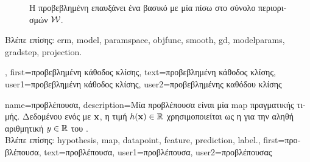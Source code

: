 {{\begin{figure}[H]
\begin{center}
		\end{center}
		{
		\caption{\foreignlanguage{greek}{Η προβεβλημένη}  \foreignlanguage{greek}{επαυξάνει ένα βασικό} 
			 \foreignlanguage{greek}{με μία}  \foreignlanguage{greek}{πίσω στο σύνολο 
			περιορισμών} $\mathcal{W}$.}
		\label{fig_projected_GD_dict} }
		\end{figure}
		\foreignlanguage{greek}{Βλέπε επίσης:} \gls{erm}, \gls{model}, \gls{paramspace}, \gls{objfunc}, \gls{smooth}, \gls{gd}, \glspl{modelparam}, 
		\gls{gradstep}, \gls{projection}.},
	first={\foreignlanguage{greek}{προβεβλημένη κάθοδος κλίσης}},
	text={\foreignlanguage{greek}{προβεβλημένη κάθοδος κλίσης}},
	user1={\foreignlanguage{greek}{προβεβλημένη κάθοδος κλίσης}}, %
	user2={\foreignlanguage{greek}{προβεβλημένης καθόδου κλίσης}} %
}

{name={\foreignlanguage{greek}{προβλέπουσα}},
	description={\foreignlanguage{greek}{Μία προβλέπουσα είναι μία} \gls{map}  
		\foreignlanguage{greek}{πραγματικής τιμής. Δεδομένου ενός}  \foreignlanguage{greek}{με}  
		${\bf x}$, \foreignlanguage{greek}{η τιμή $h({\bf x}) \in \mathbb{R}$ χρησιμοποιείται ως η}  
		\foreignlanguage{greek}{για την αληθή αριθμητική}  $y \in \mathbb{R}$ \foreignlanguage{greek}{του} .\\
		\foreignlanguage{greek}{Βλέπε επίσης:} \gls{hypothesis}, \gls{map}, \gls{datapoint}, \gls{feature}, \gls{prediction}, \gls{label}.},
	first={\foreignlanguage{greek}{προβλέπουσα}},
	text={\foreignlanguage{greek}{προβλέπουσα}},
	user1={\foreignlanguage{greek}{προβλέπουσα}}, %
  	user2={\foreignlanguage{greek}{προβλέπουσας}} %
}

